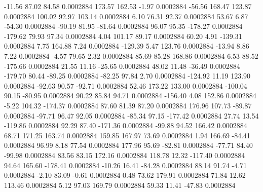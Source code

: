       -11.56       87.02       84.58     0.0002884
      173.57      162.53       -1.97     0.0002884
      -56.56      168.47      123.87     0.0002884
      100.02       92.97      103.14     0.0002884
        6.10       76.31       92.37     0.0002884
       53.67        6.87      -54.30     0.0002884
      -90.19       81.95      -81.64     0.0002884
       96.07       95.35     -178.27     0.0002884
     -179.62       79.93       97.34     0.0002884
        4.04      101.17       89.17     0.0002884
       60.20        4.91     -139.31     0.0002884
        7.75      164.88        7.24     0.0002884
     -129.39        5.47      123.76     0.0002884
      -13.94        8.86        7.22     0.0002884
       -4.57       79.65        2.32     0.0002884
       85.69       85.28      168.86     0.0002884
        6.53       88.52     -175.66     0.0002884
       21.55       11.16      -25.65     0.0002884
       48.02       11.48      -36.49     0.0002884
     -179.70       80.44      -89.25     0.0002884
      -82.25       97.84        2.70     0.0002884
     -124.92       11.19      123.90     0.0002884
      -92.63       90.57      -92.71     0.0002884
       52.46      173.22      133.00     0.0002884
     -100.04       90.15      -80.95     0.0002884
       90.22       85.84       94.71     0.0002884
     -156.40        4.08      152.86     0.0002884
       -5.22      104.32     -174.37     0.0002884
       87.60       81.39       87.20     0.0002884
      176.96      107.73      -89.87     0.0002884
      -97.71       96.47       92.05     0.0002884
      -85.34       97.15     -177.42     0.0002884
       27.74       13.54     -119.86     0.0002884
       92.29       87.40     -171.36     0.0002884
      -99.88       94.52      166.42     0.0002884
       68.71      171.25      163.74     0.0002884
      159.85      167.97       73.69     0.0002884
        1.94      166.69      -84.41     0.0002884
       96.99        8.18       77.54     0.0002884
      177.96       95.69      -82.81     0.0002884
      -77.71       84.40      -99.98     0.0002884
       83.56       83.15      172.16     0.0002884
      118.78       12.32     -117.40     0.0002884
       94.64      165.60     -178.41     0.0002884
      -10.26       16.41      -84.28     0.0002884
       88.14       91.74       -4.71     0.0002884
       -2.10       83.09       -0.61     0.0002884
        0.48       73.62      179.91     0.0002884
       71.84       12.62      113.46     0.0002884
        5.12       97.03      169.79     0.0002884
       59.33       11.41      -47.83     0.0002884
